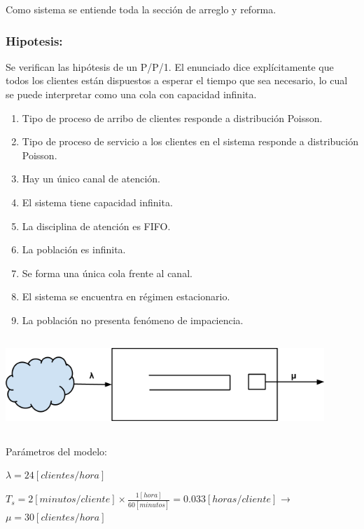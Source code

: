 \documentclass[a4paper,11pt]{article}
\begin{document}
Como sistema se entiende toda la sección de arreglo y
reforma.

\vspace{5pt}
\subsubsection*{Hipotesis:}

Se verifican las hipótesis de un P/P/1. El enunciado dice explícitamente que
todos los clientes están dispuestos a esperar el tiempo que sea necesario, lo
cual se puede interpretar como una cola con capacidad infinita.

\begin{enumerate}[1.]
  \item Tipo de proceso de arribo de clientes responde a distribución Poisson.
  \item Tipo de proceso de servicio a los clientes en el sistema responde a
    distribución Poisson.
  \item Hay un único canal de atención.
  \item El sistema tiene capacidad infinita.
  \item La disciplina de atención es FIFO.
  \item La población es infinita.
  \item Se forma una única cola frente al canal.
  \item El sistema se encuentra en régimen estacionario.
  \item La población no presenta fenómeno de impaciencia.
\end{enumerate}

\vspace{13pt}
\includegraphics[width=341pt, height=101pt, keepaspectratio=true]{TP1-Colas-fig001.png}

\vspace{27pt}
Parámetros del modelo:

$\lambda = 24 [clientes/hora]$

$T_s = 2 [minutos/cliente] \times \frac{1[hora]}{60[minutos]} = 0.033
[horas/cliente]$ → $\mu = 30 [clientes/hora]$
\end{document}
